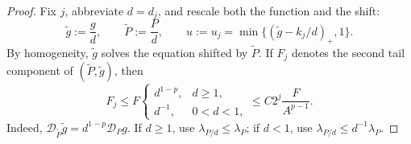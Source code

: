 \documentclass[11pt,reqno]{amsart}
\numberwithin{equation}{section}
\theoremstyle{remark}
\begin{document}
\begin{proof}
Fix \(j\), abbreviate \(d=d_j\), and rescale both the function and the
shift:
\[
 \widetilde g:=\frac gd,\qquad \widetilde P:=\frac Pd,\qquad
 u:=u_j=\min\{(\widetilde g-k_j/d)_+,1\}.
\]
By homogeneity, \(\widetilde g\) solves the equation shifted by
\(\widetilde P\).  If \(F_j\) denotes the second tail component of
\((\widetilde P,\widetilde g)\), then
\begin{equation}
 F_j\le F
 \begin{cases}
 d^{1-p},&d\ge1,\\
 d^{-1},&0<d<1,
 \end{cases}
 \le C2^j\frac{F}{A^{p-1}}.
 \label{eq:normalized-capped-tail}
\end{equation}
Indeed,
\(\mathcal D_{\widetilde P}\widetilde g
=d^{1-p}\mathcal D_Pg\).  If \(d\ge1\), use
\(\lambda_{P/d}\le\lambda_P\); if \(d<1\), use
\(\lambda_{P/d}\le d^{-1}\lambda_P\).


\end{proof}
\end{document}
